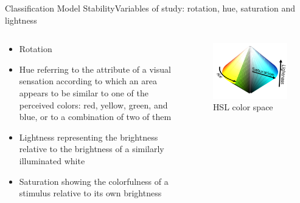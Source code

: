 \documentclass{beamer}
\begin{document}
\begin{frame}{Classification Model Stability}{Variables of study: rotation, hue, saturation and lightness}
\begin{columns}
	\begin{column}{0.6\textwidth}
		\begin{itemize}
			\item Rotation
			\item Hue referring to
			the attribute of a visual sensation according to which an area appears to be similar to one of the perceived colors: red, yellow, green, and blue, or to a
			combination of two of them 
			\item Lightness representing the brightness relative to the brightness of a similarly illuminated white
			\item Saturation showing the colorfulness of a
			stimulus relative to its own brightness
		\end{itemize}	
	\end{column}
	\begin{column}{0.4\textwidth}  %
		\begin{figure}[p]
			\centering
			\includegraphics[width=\textwidth]{HSL_color_solid_dblcone.png}
			\caption{HSL color space}
		\end{figure}
	\end{column}
\end{columns}

\end{frame}
\end{document}
